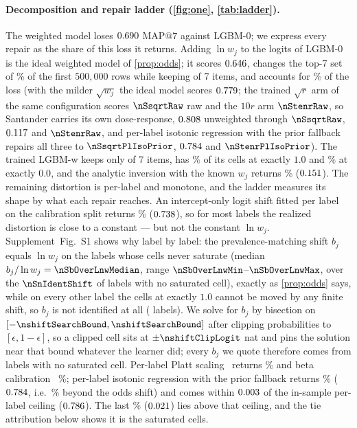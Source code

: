 \documentclass[sigconf,nonacm]{acmart}
\makeatletter
\newcommand{\Sm}{\textsf{LGBM-w}\xspace}
\newcommand{\Nm}{\textsf{LGBM-0}\xspace}
\newcommand{\mapseven}{\mathrm{MAP}@7\xspace}
\newcommand{\Supp}[1]{Supplement~#1}  %
\makeatother
\begin{document}
\paragraph{Decomposition and repair ladder (\cref{fig:one}, \cref{tab:ladder}).} The weighted model loses $0.690$ $\mapseven$ against \Nm; we express every repair as the share of this loss it returns. Adding $\ln w_j$ to the logits of \Nm is the ideal weighted model of \cref{prop:odds}; it scores $0.646$, changes the top-7 set of \nfracRowsChangedWhatif\% of the first $500{,}000$ rows while keeping \noverlapWhatif{} of 7 items, and accounts for \noddsShare\% of the loss (with the milder $\sqrt{w_j}$ the ideal model scores $0.779$; the trained $\sqrt{r}$ arm of the same configuration scores $\nSsqrtRaw$ raw and the $10r$ arm $\nStenrRaw$, so Santander carries its own dose-response, $0.808$ unweighted through $\nSsqrtRaw$, $0.117$ and $\nStenrRaw$, and per-label isotonic regression with the prior fallback repairs all three to $\nSsqrtPlIsoPrior$, $0.784$ and $\nStenrPlIsoPrior$). The trained \Sm keeps only \noverlapS{} of 7 items, has \nSsatOne\% of its cells at exactly $1.0$ and \nSsatZero\% at exactly $0.0$, and the analytic inversion with the known $w_j$ returns \nelkanShare\% ($0.151$). The remaining distortion is per-label and monotone, and the ladder measures its shape by what each repair reaches. An intercept-only logit shift fitted per label on the calibration split returns \noffsetShare\% ($0.738$), so for most labels the realized distortion is close to a constant --- but not the constant $\ln w_j$. \Supp{Fig.~S1} shows why label by label: the prevalence-matching shift $b_j$ equals $\ln w_j$ on the labels whose cells never saturate (median $b_j/\ln w_j=\nSbOverLnwMedian$, range $\nSbOverLnwMin$--$\nSbOverLnwMax$, over the $\nSnIdentShift$ of \nnLabels{} labels with no saturated cell), exactly as \cref{prop:odds} says, while on every other label the cells at exactly $1.0$ cannot be moved by any finite shift, so $b_j$ is not identified at all (\nnCappedShift{} labels). We solve for $b_j$ by bisection on $[-\nshiftSearchBound,\nshiftSearchBound]$ after clipping probabilities to $[\epsilon,1-\epsilon]$, so a clipped cell sits at $\pm\nshiftClipLogit$ nat and pins the solution near that bound whatever the learner did; every $b_j$ we quote therefore comes from labels with no saturated cell. Per-label Platt scaling~\cite{Platt1999} returns \nplattShare\% and beta calibration~\cite{Kull2017Beta} \nbetaShare\%; per-label isotonic regression with the prior fallback returns \nrepairShare\% ($0.784$, i.e.\ \nrepairExtraShare\% beyond the odds shift) and comes within $0.003$ of the in-sample per-label ceiling ($0.786$). The last \ntieShare\% ($0.021$) lies above that ceiling, and the tie attribution below shows it is the saturated cells.
\end{document}
